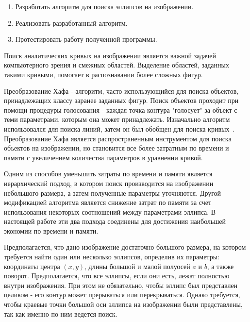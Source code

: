 




\Task
\begin{enumerate}
  \item
Разработать алгоритм для поиска эллипсов на изображении.
  \item
Реализовать разработанный алгоритм.
  \item
Протестировать работу полученной программы.
\end{enumerate}
\Intro
Поиск аналитических кривых на изображении является важной задачей компьютерного зрения и смежных областей. Выделение областей, заданных такими кривыми, помогает в распознавании более сложных фигур.

Преобразование Хафа - алгоритм, часто использующийся для поиска объектов, принадлежащих классу заранее заданных фигур. 
Поиск объектов проходит при помощи процедуры голосования - каждая точка контура "голосует" за объект с теми параметрами, которым она может принадлежать. 
Изначально алгоритм использовался для поиска линий, затем он был обобщен для поиска кривых~\autocite{Duda}.
Преобразование Хафа является распространенным инструментом для поиска объектов на изображении, но становится все более затратным по времени и памяти с увеличением количества параметров в уравнении кривой.

Одним из способов уменьшить затраты по времени и памяти является иерархический подход, в котором поиск производится на изображении небольшого размера, а затем полученные параметры уточняются. 
Другой модификацией алгоритма является снижение затрат по памяти за счет использования некоторых соотношений между параметрами эллипса.
В настоящей работе эти два подхода соединены для достижения наибольшей экономии по времени и памяти.

Предполагается, что дано изображение достаточно большого размера, на котором требуется найти один или несколько эллипсов, определив их параметры: 
координаты центра \((x, y)\), длины большой и малой полуосей \(a\) и \(b\), а также поворот. Предполагается, что все эллипсы, если они есть, лежат 
полностью внутри изображения. При этом не обязательно, чтобы эллипс был представлен целиком - его контур может прерываться или перекрываться. 
Однако требуется, чтобы краевые точки большой оси эллипса на изображении были представлены, так как именно по ним ведется поиск.  

